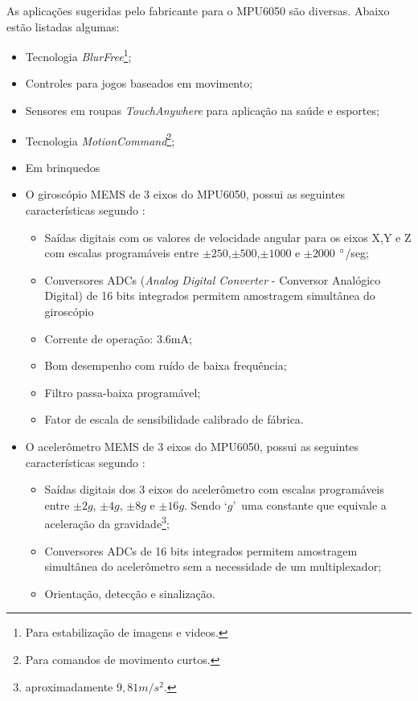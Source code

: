 	As aplicações sugeridas pelo fabricante para o MPU6050 são diversas. Abaixo estão listadas algumas:
	\begin{itemize}
		\item Tecnologia \textit{ BlurFree\texttrademark }\footnote{Para estabilização de imagens e videos.};
		\item Controles para jogos baseados em movimento;
		\item Sensores em roupas \textit{TouchAnywhere} para aplicação na saúde e esportes;
		\item Tecnologia \textit{ MotionCommand\texttrademark}\footnote{Para comandos de movimento curtos.}; 
		\item Em brinquedos
	\end{itemize}
	
	\begin{description}
		\item[Características do MPU6050]  
		\item \begin{itemize}	 
		
		\item O giroscópio MEMS de 3 eixos do MPU6050, possui as seguintes características segundo \cite{mpu6050}:
			\begin{itemize}
				\item Saídas digitais com os valores de velocidade angular para os eixos X,Y e Z com escalas programáveis entre $ \pm250 $,$ \pm500 $,$ \pm1000 $ e $ \pm 2000$ $\degree$/seg;
				\item Conversores ADCs (\textit{Analog Digital Converter} - Conversor Analógico Digital) de 16 bits integrados permitem amostragem simultânea do giroscópio
				\item Corrente de operação: 3.6mA;
				\item Bom desempenho com ruído de baixa frequência;
				\item Filtro passa-baixa programável;
				\item Fator de escala de sensibilidade calibrado de fábrica.
			\end{itemize}
			
		\item O acelerômetro MEMS de 3 eixos do MPU6050, possui as seguintes características segundo \cite{mpu6050}:
			\begin{itemize}
				\item Saídas digitais dos 3 eixos do acelerômetro com escalas programáveis entre $\pm2g$, $\pm4g$, $\pm8g$ e $\pm16g$. Sendo \textquoteleft$ g$\textquoteright \ uma constante que equivale a aceleração da gravidade\footnote{aproximadamente $9,81 m/s^2 $.};
				\item Conversores ADCs de 16 bits integrados permitem amostragem simultânea do acelerômetro sem a necessidade de um multiplexador;
				\item Orientação, detecção e sinalização.
				
			\end{itemize}
		\end{itemize}
	\end{description}
	

